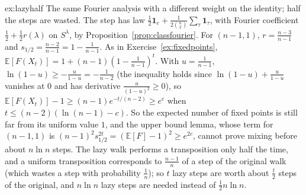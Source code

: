 \begin{solution}{ex:lazyhalf}
\idea The same Fourier analysis with a different weight on the identity; half the steps are wasted.
\writeup The step has law $\frac12\mathbf 1_e+\frac1{2\binom n2}\sum_\tau\mathbf 1_\tau$, with Fourier coefficient $\frac12+\frac12r(\lambda)$ on $S^\lambda$, by Proposition~\ref{prop:classfourier}. For $(n-1,1)$, $r=\frac{n-3}{n-1}$ and $s_{1/2}=\frac{n-2}{n-1}=1-\frac1{n-1}$. As in Exercise~\ref{ex:fixedpoints},
$\mathbb E[F(X_t)]=1+(n-1)(1-\frac1{n-1})^t$. With $u=\frac1{n-1}$, $\ln(1-u)\ge-\frac u{1-u}=-\frac1{n-2}$ (the inequality holds since $\ln(1-u)+\frac u{1-u}$ vanishes at $0$ and has derivative $\frac u{(1-u)^2}\ge0$), so
$\mathbb E[F(X_t)]-1\ge(n-1)e^{-t/(n-2)}\ge e^c$ when $t\le(n-2)(\ln(n-1)-c)$. So the expected number of fixed points is still far from its uniform value $1$, and the upper bound lemma, whose term for $(n-1,1)$ is $(n-1)^2s_{1/2}^{2t}=(\mathbb E[F]-1)^2\ge e^{2c}$, cannot prove mixing before about $n\ln n$ steps. The lazy walk performs a transposition only half the time, and a uniform transposition
corresponds to $\frac{n-1}n$ of a step of the original walk (which wastes a step with probability $\frac1n$); so $t$ lazy steps are worth about $\frac t2$ steps of the original, and $n\ln n$ lazy steps are needed instead of $\frac12n\ln n$.
\end{solution}

